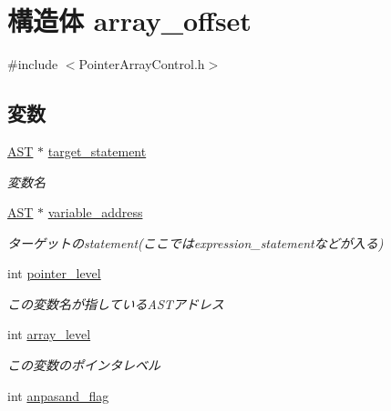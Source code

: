 \section{構造体 array\_\-offset}
\label{structarray__offset}


{\ttfamily \#include $<$PointerArrayControl.h$>$}

\subsection*{変数}
\begin{DoxyCompactItemize}
\item 
\hyperlink{structabstract__syntax__tree}{AST} $\ast$ \hyperlink{structarray__offset_afd077f3bd6710cff01a7b45ed165bde2}{target\_\-statement}\label{structarray__offset_afd077f3bd6710cff01a7b45ed165bde2}

\begin{DoxyCompactList}\small\item\em 変数名 \item\end{DoxyCompactList}\item 
\hyperlink{structabstract__syntax__tree}{AST} $\ast$ \hyperlink{structarray__offset_af1c0654e42cb4c87213a76c1a5ed1b49}{variable\_\-address}\label{structarray__offset_af1c0654e42cb4c87213a76c1a5ed1b49}

\begin{DoxyCompactList}\small\item\em ターゲットのstatement(ここではexpression\_\-statementなどが入る) \item\end{DoxyCompactList}\item 
int \hyperlink{structarray__offset_acdec5a49acb00313d5f2639a8d65a19e}{pointer\_\-level}\label{structarray__offset_acdec5a49acb00313d5f2639a8d65a19e}

\begin{DoxyCompactList}\small\item\em この変数名が指しているASTアドレス \item\end{DoxyCompactList}\item 
int \hyperlink{structarray__offset_a7b52678b7dd18aee856cea8a4d33c31b}{array\_\-level}\label{structarray__offset_a7b52678b7dd18aee856cea8a4d33c31b}

\begin{DoxyCompactList}\small\item\em この変数のポインタレベル \item\end{DoxyCompactList}\item 
int \hyperlink{structarray__offset_abb7708411833c87b184d43809fd0d0fa}{anpasand\_\-flag}\label{structarray__offset_abb7708411833c87b184d43809fd0d0fa}


\end{DoxyCompactItemize}
